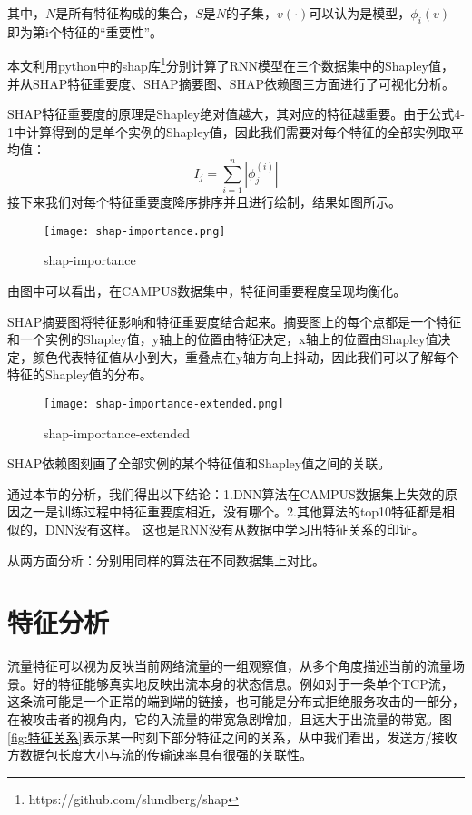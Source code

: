其中，$N$是所有特征构成的集合，$S$是$N$的子集，$v(\cdot)$可以认为是模型，$\phi_i(v)$ 即为第i个特征的“重要性”。

本文利用python中的shap库\footnote{https://github.com/slundberg/shap}分别计算了RNN模型在三个数据集中的Shapley值，并从SHAP特征重要度、SHAP摘要图、SHAP依赖图三方面进行了可视化分析。

SHAP特征重要度的原理是Shapley绝对值越大，其对应的特征越重要。由于公式4-1中计算得到的是单个实例的Shapley值，因此我们需要对每个特征的全部实例取平均值：
\begin{equation}
  I_j = \sum_{i=1}^n |\phi_j^{(i)}|
\end{equation}
接下来我们对每个特征重要度降序排序并且进行绘制，结果如图所示。

\begin{figure}
  \centering
  \texttt{[image: shap-importance.png]}
  \caption{shap-importance}
  \label{fig:shap-importance}
\end{figure}

由图中可以看出，在CAMPUS数据集中，特征间重要程度呈现均衡化。

SHAP摘要图将特征影响和特征重要度结合起来。摘要图上的每个点都是一个特征和一个实例的Shapley值，y轴上的位置由特征决定，x轴上的位置由Shapley值决定，颜色代表特征值从小到大，重叠点在y轴方向上抖动，因此我们可以了解每个特征的Shapley值的分布。

\begin{figure}
  \centering
  \texttt{[image: shap-importance-extended.png]}
  \caption{shap-importance-extended}
  \label{fig:shap-importance-extended}
\end{figure}

SHAP依赖图刻画了全部实例的某个特征值和Shapley值之间的关联。

通过本节的分析，我们得出以下结论：1.DNN算法在CAMPUS数据集上失效的原因之一是训练过程中特征重要度相近，没有哪个。2.其他算法的top10特征都是相似的，DNN没有这样。 这也是RNN没有从数据中学习出特征关系的印证。

从两方面分析：分别用同样的算法在不同数据集上对比。
\section{特征分析}
流量特征可以视为反映当前网络流量的一组观察值，从多个角度描述当前的流量场景。好的特征能够真实地反映出流本身的状态信息。例如对于一条单个TCP流，这条流可能是一个正常的端到端的链接，也可能是分布式拒绝服务攻击的一部分，在被攻击者的视角内，它的入流量的带宽急剧增加，且远大于出流量的带宽。图\ref{fig:特征关系}表示某一时刻下部分特征之间的关系，从中我们看出，发送方/接收方数据包长度大小与流的传输速率具有很强的关联性。

